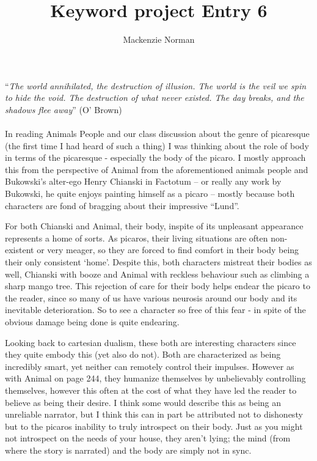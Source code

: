\documentclass{article}
\title{Keyword project Entry 6}
\author{Mackenzie Norman}
\begin{document}
\maketitle
``\textit{The world annihilated, the destruction of illusion. The world is the veil we spin to hide the void. The destruction of what never existed. The day breaks, and the shadows flee away}'' (O' Brown)
\paragraph{}

In reading Animals People and our class discussion about the genre of picaresque (the first time I had heard of such a thing) I was thinking about the role of body in terms of the picaresque - especially the body of the picaro. I mostly approach this from the perspective of Animal from the aforementioned animals people and Bukowski's alter-ego Henry Chianski in Factotum -- or really any work by Bukowski, he quite enjoys painting himself as a picaro -- mostly because both characters are fond of bragging about their impressive ``Lund''. 

For both Chianski and Animal, their body, inspite of its unpleasant appearance represents a home of sorts. As picaros, their living situations are often non-existent or very meager, so they are forced to find comfort in their body being their only consistent `home'. Despite this, both characters mistreat their bodies as well, Chianski with booze and Animal with reckless behaviour such as climbing a sharp mango tree. This rejection of care for their body helps endear the picaro to the reader, since so many of us have various neurosis around our body and its inevitable deterioration. So to see a character so free of this fear - in spite of the obvious damage being done is quite endearing. 

Looking back to cartesian dualism, these both are interesting characters since they quite embody this (yet also do not). Both are characterized as being incredibly smart, yet neither can remotely control their impulses. However as with Animal on page 244, they humanize themselves by unbelievably controlling themselves, however this often at the cost of what they have led the reader to believe as being their desire. I think some would describe this as being an unreliable narrator, but I think this can in part be attributed not to dishonesty but to the picaros inability to truly introspect on their body. Just as you might not introspect on the needs of your house, they aren't lying; the mind (from where the story is narrated) and the body are simply not in sync. 
\end{document}
